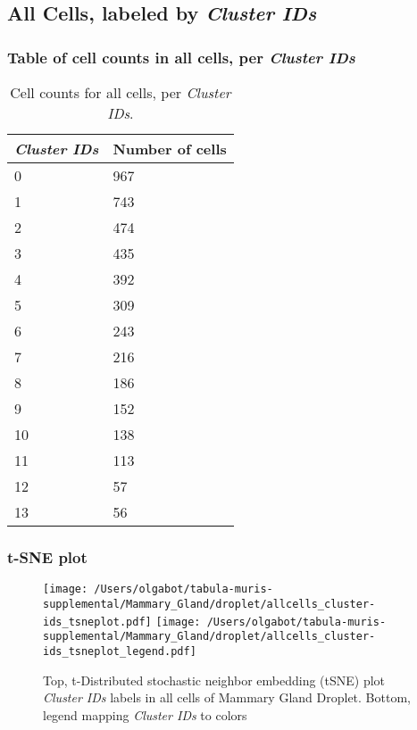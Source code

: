 \clearpage

\subsection{All Cells, labeled by \emph{Cluster IDs}}
\subsubsection{Table of cell counts in all cells, per \emph{Cluster IDs}}\begin{table}[h]
\centering
\label{my-label}
\begin{tabular}{@{}ll@{}}
\toprule

\emph{Cluster IDs}& Number of cells \\ \midrule
0 & 967 \\

1 & 743 \\

2 & 474 \\

3 & 435 \\

4 & 392 \\

5 & 309 \\

6 & 243 \\

7 & 216 \\

8 & 186 \\

9 & 152 \\

10 & 138 \\

11 & 113 \\

12 & 57 \\

13 & 56 \\
\bottomrule
\end{tabular}
\caption{Cell counts for all cells, per \emph{Cluster IDs}.}
\end{table}

\clearpage
\subsubsection{t-SNE plot}
\begin{figure}[h]
\centering
\texttt{[image: /Users/olgabot/tabula-muris-supplemental/Mammary\_Gland/droplet/allcells\_cluster-ids\_tsneplot.pdf]}
\texttt{[image: /Users/olgabot/tabula-muris-supplemental/Mammary\_Gland/droplet/allcells\_cluster-ids\_tsneplot\_legend.pdf]}
\caption{Top, t-Distributed stochastic neighbor embedding (tSNE) plot  \emph{Cluster IDs} labels in all cells of Mammary Gland Droplet. Bottom, legend mapping \emph{Cluster IDs} to colors}
\end{figure}


